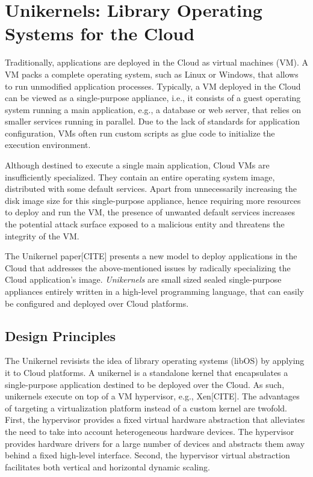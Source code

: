 \section{Unikernels: Library Operating Systems for the Cloud}
Traditionally, applications are deployed in the Cloud as virtual machines (VM).
A VM packs a complete operating system, such as Linux or Windows, that allows to run unmodified application processes.
Typically, a VM deployed in the Cloud can be viewed as a single-purpose appliance, i.e., it consists of a guest operating system running a main application, e.g., a database or web server, that relies on smaller services running in parallel.
Due to the lack of standards for application configuration, VMs often run custom scripts as glue code to initialize the execution environment.

Although destined to execute a single main application, Cloud VMs are insufficiently specialized.
They contain an entire operating system image, distributed with some default services.
Apart from unnecessarily increasing the disk image size for this single-purpose appliance, hence requiring more resources to deploy and run the VM, the presence of unwanted default services increases the potential attack surface exposed to a malicious entity and threatens the integrity of the VM.

The Unikernel paper[CITE] presents a new model to deploy applications in the Cloud that addresses the above-mentioned issues by radically specializing the Cloud application's image.
\emph{Unikernels} are small sized sealed single-purpose appliances entirely written in a high-level programming language, that can easily be configured and deployed over Cloud platforms.


\subsection{Design Principles}
The Unikernel revisists the idea of library operating systems (libOS) by applying it to Cloud platforms.
A unikernel is a standalone kernel that encapsulates a single-purpose application destined to be deployed over the Cloud.
As such, unikernels execute on top of a VM hypervisor, e.g., Xen[CITE].
The advantages of targeting a virtualization platform instead of a custom kernel are twofold.
First, the hypervisor provides a fixed virtual hardware abstraction that alleviates the need to take into account heterogeneous hardware devices.
The hypervisor provides hardware drivers for a large number of devices and abstracts them away behind a fixed high-level interface.
Second, the hypervisor virtual abstraction facilitates both vertical and horizontal dynamic scaling.

